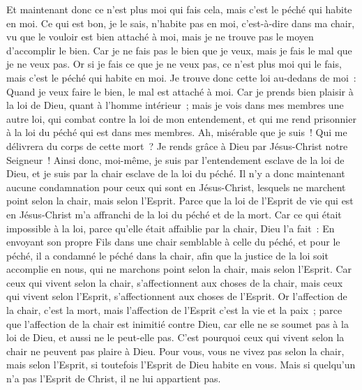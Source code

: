 \begin{multicols}{2}
Et maintenant donc ce n'est plus moi qui fais cela, mais c'est le péché qui habite en moi.
Ce qui est bon, je le sais, n'habite pas en moi, c'est-à-dire dans ma chair, vu que le vouloir est bien attaché à moi, mais je ne trouve pas le moyen d'accomplir le bien.
Car je ne fais pas le bien que je veux, mais je fais le mal que je ne veux pas.
Or si je fais ce que je ne veux pas, ce n'est plus moi qui le fais, mais c'est le péché qui habite en moi.
Je trouve donc cette loi au-dedans de moi~: Quand je veux faire le bien, le mal est attaché à moi.
Car je prends bien plaisir à la loi de Dieu, quant à l'homme intérieur~;
mais je vois dans mes membres une autre loi, qui combat contre la loi de mon entendement, et qui me rend prisonnier à la loi du péché qui est dans mes membres.
Ah, misérable que je suis~! Qui me délivrera du corps de cette mort~?
Je rends grâce à Dieu par Jésus-Christ notre Seigneur~! Ainsi donc, moi-même, je suis par l'entendement esclave de la loi de Dieu, et je suis par la chair esclave de la loi du péché.
\VerseOne{}Il n'y a donc maintenant aucune condamnation pour ceux qui sont en Jésus-Christ, lesquels ne marchent point selon la chair, mais selon l'Esprit.
Parce que la loi de l'Esprit de vie qui est en Jésus-Christ m'a affranchi de la loi du péché et de la mort.
Car ce qui était impossible à la loi, parce qu'elle était affaiblie par la chair, Dieu l'a fait~: En envoyant son propre Fils dans une chair semblable à celle du péché, et pour le péché, il a condamné le péché dans la chair,
afin que la justice de la loi soit accomplie en nous, qui ne marchons point selon la chair, mais selon l'Esprit.
Car ceux qui vivent selon la chair, s'affectionnent aux choses de la chair, mais ceux qui vivent selon l'Esprit, s'affectionnent aux choses de l'Esprit.
Or l'affection de la chair, c'est la mort, mais l'affection de l'Esprit c'est la vie et la paix~;
parce que l'affection de la chair est inimitié contre Dieu, car elle ne se soumet pas à la loi de Dieu, et aussi ne le peut-elle pas.
C'est pourquoi ceux qui vivent selon la chair ne peuvent pas plaire à Dieu.
Pour vous, vous ne vivez pas selon la chair, mais selon l'Esprit, si toutefois l'Esprit de Dieu habite en vous. Mais si quelqu'un n'a pas l'Esprit de Christ, il ne lui appartient pas.

\end{multicols}
